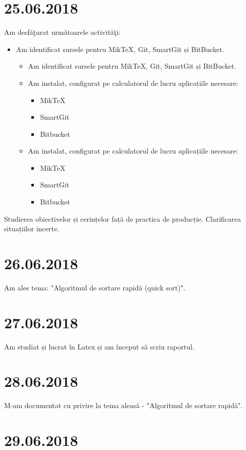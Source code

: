 \documentclass{report}
\begin{document}
\chapter{25.06.2018}
Am desfăţurat următoarele activităţi:
\begin{itemize}
\item
Am identificat sursele pentru MikTeX, Git, SmartGit și BitBucket.
\begin{itemize}
\item
Am identificat sursele pentru MikTeX, Git, SmartGit și BitBucket.
\item
Am instalat, configurat pe calculatorul de lucru aplicațiile necesare:
\begin{itemize}
\item
MikTeX
\item
SmartGit
\item
Bitbucket
\end{itemize}
\item
Am instalat, configurat pe calculatorul de lucru aplicațiile necesare:
\begin{itemize}
\item
MikTeX
\item
SmartGit
\item
Bitbucket
\end{itemize}
\end{itemize}
\end{itemize}
Studierea obiectivelor și cerințelor față de practica de producție. Clarificarea situațiilor incerte.


\chapter{26.06.2018}
Am ales tema: "Algoritmul de sortare rapidă (quick sort)".
\chapter{27.06.2018}
Am studiat și lucrat în Latex și am început să scriu raportul. 

\chapter{28.06.2018}

M-am documentat cu privire la tema aleasă - "Algoritmul de sortare rapidă".

\chapter{29.06.2018}
\end{document}
